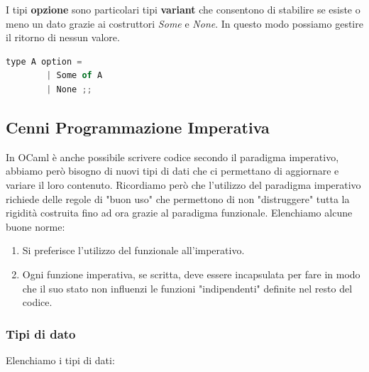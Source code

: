 \documentclass{article}
\begin{document}
I tipi \textbf{opzione} sono particolari tipi \textbf{variant} che consentono di stabilire se esiste o meno un dato grazie ai costruttori \textit{Some} e \textit{None}. In questo modo possiamo gestire il ritorno di nessun valore. 

\vspace*{10px}
\begin{lstlisting}[language = JavaScript]
    type A option =
        | Some of A
        | None ;;
\end{lstlisting}
\vspace*{-20px}

\newpage

\subsection{Cenni Programmazione Imperativa}

In OCaml è anche possibile scrivere codice secondo il paradigma imperativo, abbiamo però bisogno di nuovi tipi di dati che ci permettano di aggiornare e variare il loro contenuto. 
Ricordiamo però che l'utilizzo del paradigma imperativo richiede delle regole di "buon uso" che permettono di non "distruggere" tutta la rigidità costruita fino ad ora grazie al paradigma funzionale. Elenchiamo alcune buone norme:
\begin{enumerate}
    \item Si preferisce l'utilizzo del funzionale all'imperativo.
    \item Ogni funzione imperativa, se scritta, deve essere incapsulata per fare in modo che il suo stato non influenzi le funzioni "indipendenti" definite nel resto del codice.
\end{enumerate}

\subsubsection{Tipi di dato}

\vspace*{10px}

Elenchiamo i tipi di dati:

\vspace*{10px}
\end{document}
